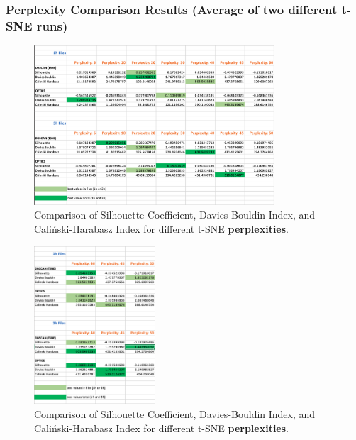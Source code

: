 \subsubsection{Perplexity Comparison Results (Average of two different t-SNE runs)}
\label{appendix:compareAveragePerplexity}

\begin{figure}
  \centering
  \includegraphics[width=0.8\textwidth]{./images/tsneParametersTest/perplexity/perplexityEvaluationScoresAverage.png}
  \caption{Comparison of Silhouette Coefficient, Davies-Bouldin Index, and Caliński-Harabasz Index for different t-SNE \textbf{perplexities}.}
  \label{figure:perplexityEvaluationScoresAverage}
\end{figure}

\begin{figure}
  \centering
  \includegraphics[width=0.4\textwidth]{./images/tsneParametersTest/perplexity/perplexityEvaluationScoresDetailedAverage.png}
  \caption{Comparison of Silhouette Coefficient, Davies-Bouldin Index, and Caliński-Harabasz Index for different t-SNE \textbf{perplexities}.}
  \label{figure:perplexityEvaluationScoresDetailedAverage}
\end{figure}